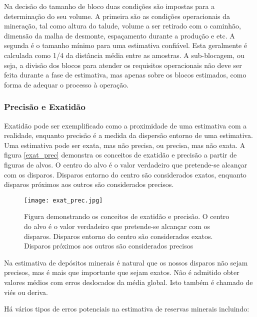 Na decisão do tamanho de bloco duas condições são impostas para a determinação do seu volume. A primeira são as condições operacionais da mineração, tal como altura do talude, volume a ser retirado com o caminhão, dimensão da malha de desmonte, espaçamento durante a produção e etc. A segunda é o tamanho mínimo para uma estimativa confiável. Esta geralmente é calculada como 1/4 da distância média entre as amostras. A sub-blocagem, ou seja, a divisão dos blocos para atender os requisitos operacionais não deve ser feita durante a fase de estimativa, mas apenas sobre os blocos estimados, como forma de adequar o processo à operação. 

\subsubsection{Precisão e Exatidão}

Exatidão pode ser exemplificado como a proximidade de uma estimativa com a realidade, enquanto precisão é a medida da dispersão entorno de uma estimativa. Uma estimativa pode ser exata, mas não precisa, ou precisa, mas não exata. A figura \eqref{exat_prec} demonstra os conceitos de exatidão e precisão a partir de figuras de alvos. O centro do alvo é o valor verdadeiro que pretende-se alcançar com os disparos. Disparos entorno do centro são considerados exatos, enquanto disparos próximos aos outros são considerados precisos. 

\begin{figure}[H]
\centering
\texttt{[image: exat\_prec.jpg]}	
\caption{Figura demonstrando os conceitos de exatidão e precisão. O centro do alvo é o valor verdadeiro que pretende-se alcançar com os disparos. Disparos entorno do centro são considerados exatos. Disparos próximos aos outros são considerados precisos }
\label{exat_prec}
\end{figure}

Na estimativa de depósitos minerais é natural que os nossos disparos não sejam precisos, mas é mais que importante que sejam exatos. Não é admitido obter valores médios com erros deslocados da média global. Isto também é chamado de viés ou deriva. 

Há vários tipos de erros potenciais na estimativa de reservas minerais incluindo:

